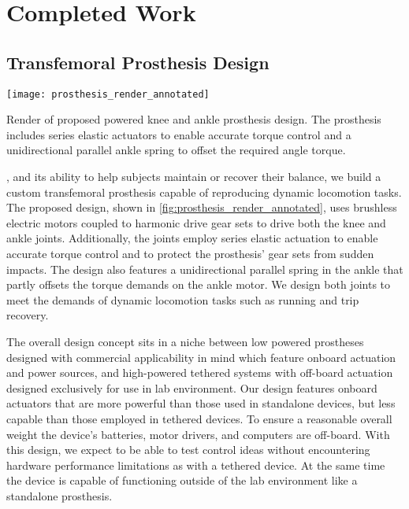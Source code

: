 \chapter{Completed Work}\label{sec:completed_work}

\section{Transfemoral Prosthesis Design}\label{sec:completed_design}
\begin{marginfigure}[1.25in]
    \centering
    \texttt{[image: prosthesis\_render\_annotated]}
    \caption{Render of proposed powered knee and ankle prosthesis design. The
    prosthesis includes series elastic actuators to enable accurate torque
    control and a unidirectional parallel ankle spring to offset the required
    angle torque.}\label{fig:prosthesis_render_annotated}
\end{marginfigure} 

, and its
ability to help subjects maintain or recover their balance, we build a custom
transfemoral prosthesis capable of reproducing dynamic locomotion tasks. The
proposed design, shown in \cref{fig:prosthesis_render_annotated}, uses brushless
electric motors coupled to harmonic drive gear sets to drive both the knee and
ankle joints.  Additionally, the joints employ series elastic actuation to
enable accurate torque control and to protect the prosthesis' gear sets from
sudden impacts.  The design also features a unidirectional parallel spring in
the ankle that partly offsets the torque demands on the ankle motor.  We design
both joints to meet the demands of dynamic locomotion tasks such as running and
trip recovery.

The overall design concept sits in a niche between low powered prostheses
designed with commercial applicability in mind
\citep{sup2007design,sup2009preliminary,lawson2014robotic,rouse2015design,
martinez2011antagonistic} which feature onboard actuation and power sources, and
high-powered tethered systems \citep{caputo2013experimental,
caputo2015informing} with off-board actuation designed exclusively for use in
lab environment. Our design features onboard actuators that are more powerful
than those used in standalone devices, but less capable than those employed in
tethered devices. To ensure a reasonable overall weight the device's batteries,
motor drivers, and computers are off-board. With this design, we expect to be
able to test control ideas without encountering hardware performance limitations
as with a tethered device. At the same time the device is capable of functioning
outside of the lab environment like a standalone prosthesis. 

